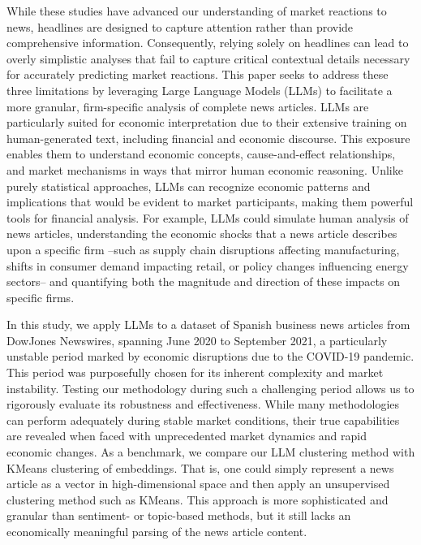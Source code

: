 While these studies have advanced our understanding of market reactions to news, headlines are designed to capture attention rather than provide comprehensive information. Consequently, relying solely on headlines can lead to overly simplistic analyses that fail to capture critical contextual details necessary for accurately predicting market reactions.
This paper seeks to address these three limitations by leveraging Large Language Models (LLMs) to facilitate a more granular, firm-specific analysis of complete news articles. 
LLMs are particularly suited for economic interpretation due to their extensive training on human-generated text, including financial and economic discourse. This exposure enables them to understand economic concepts, cause-and-effect relationships, and market mechanisms in ways that mirror human economic reasoning. Unlike purely statistical approaches, LLMs can recognize economic patterns and implications that would be evident to market participants, making them powerful tools for financial analysis.
For example, LLMs could simulate human analysis of news articles, understanding the economic shocks that a news article describes upon a specific firm --such as supply chain disruptions affecting manufacturing, shifts in consumer demand impacting retail, or policy changes influencing energy sectors-- and quantifying both the magnitude and direction of these impacts on specific firms. 

In this study, we apply LLMs to a dataset of Spanish business news articles from DowJones Newswires, spanning June 2020 to September 2021, a particularly unstable period marked by economic disruptions due to the COVID-19 pandemic. 
This period was purposefully chosen for its inherent complexity and market instability. Testing our methodology during such a challenging period allows us to rigorously evaluate its robustness and effectiveness. While many methodologies can perform adequately during stable market conditions, their true capabilities are revealed when faced with unprecedented market dynamics and rapid economic changes.
As a benchmark, we compare our LLM clustering method with KMeans clustering of embeddings. That is, one could simply represent a news article as a  vector in high-dimensional space and then apply an unsupervised clustering method such as KMeans. 
 This approach is more sophisticated and granular than sentiment- or topic-based methods, but it still lacks an economically meaningful parsing of the news article content.

